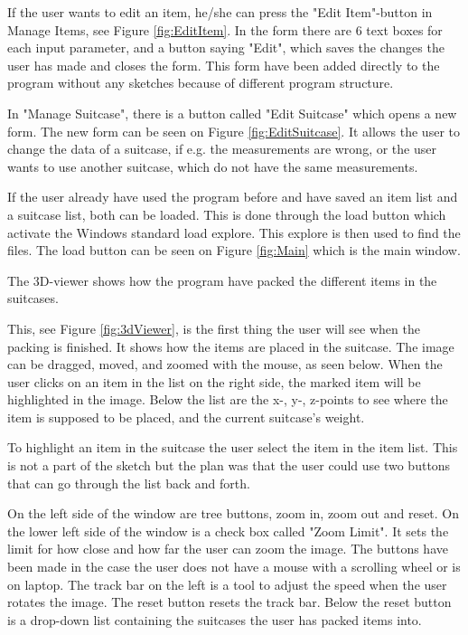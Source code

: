 If the user wants to edit an item, he/she can press the "Edit Item"-button in Manage Items, see Figure \ref{fig:EditItem}. In the form there are 6 text boxes for each input parameter, and a button saying "Edit", which saves the changes the user has made and closes the form. This form have been added directly to the program without any sketches because of different program structure.

In "Manage Suitcase", there is a button called "Edit Suitcase" which opens a new form. The new form can be seen on Figure \ref{fig:EditSuitcase}. It allows the user to change the data of a suitcase, if e.g. the measurements are wrong, or the user wants to use another suitcase, which do not have the same measurements.

If the user already have used the program before and have saved an item list and a suitcase list, both can be loaded. This is done through the load button which activate the Windows standard load explore. This explore is then used to find the files. The load button can be seen on Figure \ref{fig:Main} which is the main window.

The 3D-viewer shows how the program have packed the different items in the suitcases.


This, see Figure \ref{fig:3dViewer}, is the first thing the user will see when the packing is finished. It shows how the items are placed in the suitcase.
The image can be dragged, moved, and zoomed with the mouse, as seen below. When the user clicks on an item in the list on the right side, the marked item will be highlighted in the image. Below the list are the x-, y-, z-points to see where the item is supposed to be placed, and the current suitcase's weight.

To highlight an item in the suitcase the user select the item in the item list. This is not a part of the sketch but the plan was that the user could use two buttons that can go through the list back and forth.

On the left side of the window are tree buttons, zoom in, zoom out and reset. On the lower left side of the window is a check box called "Zoom Limit". It sets the limit for how close and how far the user can zoom the image. The buttons have been made in the case the user does not have a mouse with a scrolling wheel or is on laptop. The track bar on the left is a tool to adjust the speed when the user rotates the image. The reset button resets the track bar. Below the reset button is a drop-down list containing the suitcases the user has packed items into.

